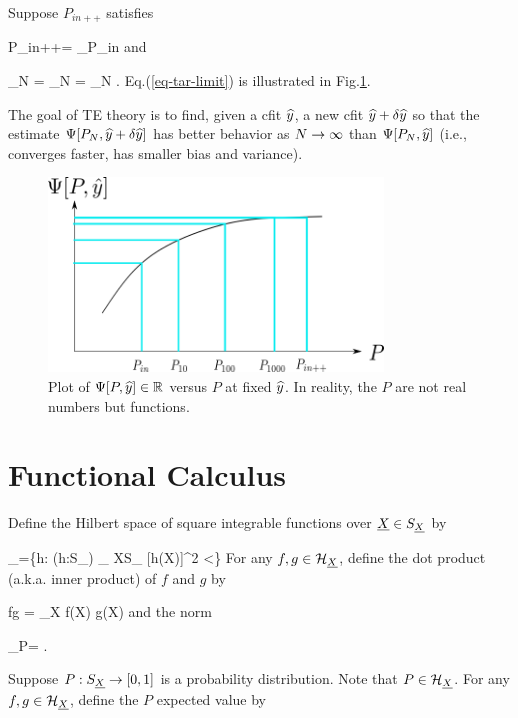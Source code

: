 Suppose $P_{in++}$ satisfies


\beq
P_{in++}= \argmin_{P_{in}}\call[P_{in}, \haty]
\eeq
and

\beq
\lim_{N\rarrow \infty}
=
\lim_{N\rarrow \infty}
=
\lim_{N\rarrow \infty}
\Psi[P_N, \haty]
\label{eq-tar-limit}
\;.
\eeq
Eq.(\ref{eq-tar-limit}) is illustrated in
Fig.\ref{fig-targeted-p-psi-plot.png}.

The goal of TE theory
is to find, given a cfit ${\widehat{y}}$,
a new cfit ${\widehat{y}} +\delta {\widehat{y}}$
so that the
estimate $\Psi[P_N, {\widehat{y}}+\delta {\widehat{y}}]$
has better behavior as $N\rightarrow \infty$ than
$\Psi[P_N, {\widehat{y}}]$ (i.e., converges faster,
has smaller bias and variance).


\begin{figure}[h!]
\centering
\includegraphics[width=3.5in]
{targeted-est/targeted-p-psi-plot.png}
\caption{
Plot of $\Psi[P, {\widehat{y}}]\in { \mathbb{R}}$ versus $P$
at fixed ${\widehat{y}}$.
In reality, the $P$ are not real numbers but
functions.
}
\label{fig-targeted-p-psi-plot.png}
\end{figure}


\section{Functional Calculus}

Define
the Hilbert space of square integrable functions over ${\underline{X}}\in S_{\underline{X}}$
by

\beq
\calh_\rvX =\{h: (h:S_\rvX\rarrow \RR) 
\sum_{ X\in S_ \rvX}[h(X)]^2 <\infty\}
\eeq
For any $f,g\in {\cal H}_{\underline{X}}$,
define the dot product (a.k.a. inner product)
of $f$ and $g$ by

\beq
f\cdot g = \sum_X f(X) g(X)
\eeq
and the norm

\beq
{}_P= 
\;.
\eeq

Suppose $P:S_{\underline{X}}\rightarrow [0,1]$
is a probability distribution.
Note that $P\in{\cal H}_{\underline{X}}$.
For any $f,g\in{\cal H}_{\underline{X}}$,
define the $P$ expected value by

